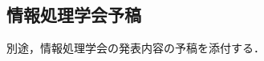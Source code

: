        \subsection{情報処理学会予稿}
        \label{情報処理学会予稿}
         \par 別途，情報処理学会の発表内容の予稿を添付する．

      
          
          
          
